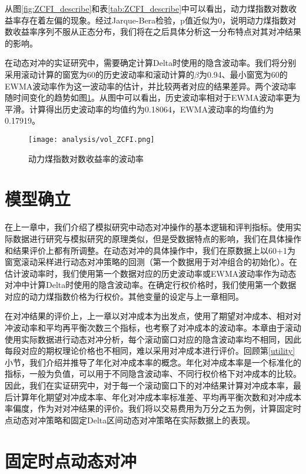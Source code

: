 从图\ref{fig:ZCFI_describe}和表\ref{tab:ZCFI_describe}中可以看出，动力煤指数对数收益率存在着左偏的现象。经过Jarque-Bera检验，p值近似为0，说明动力煤指数对数收益率序列不服从正态分布，我们将在之后具体分析这一分布特点对其对冲结果的影响。

在动态对冲的实证研究中，需要确定计算Delta时使用的隐含波动率。我们将分别采用滚动计算的窗宽为60的历史波动率和滚动计算的$\beta$为0.94、最小窗宽为60的EWMA波动率作为这一波动率的估计，并比较两者对应的结果差异。两个波动率随时间变化的趋势如图\ref{fig:vol_ZCFI}。从图中可以看出，历史波动率相对于EWMA波动率更为平滑。计算得出历史波动率的均值约为0.18064，EWMA波动率的均值约为0.17919。

\begin{figure}[htb]
  \centering
  \texttt{[image: analysis/vol\_ZCFI.png]}
  \caption[这里将出现在插图索引中]
    {动力煤指数对数收益率的波动率}
  \label{fig:vol_ZCFI}
\end{figure}

\section{模型确立}

在上一章中，我们介绍了模拟研究中动态对冲操作的基本逻辑和评判指标。使用实际数据进行研究与模拟研究的原理类似，但是受数据特点的影响，我们在具体操作和结果评价上都有所调整。在动态对冲的具体操作中，我们在原数据上以60+1为窗宽滚动采样进行动态对冲策略的回测（第一个数据用于对冲组合的初始化）。在估计波动率时，我们使用第一个数据对应的历史波动率或EWMA波动率作为动态对冲中计算Delta时使用的隐含波动率。在确定行权价格时，我们使用第一个数据对应的动力煤指数价格为行权价。其他变量的设定与上一章相同。

在对冲结果的评价上，上一章以对冲成本为出发点，使用了期望对冲成本、相对对冲波动率和平均再平衡次数三个指标，也考察了对冲成本的波动率。本章由于滚动使用实际数据进行动态对冲分析，每个滚动窗口对应的隐含波动率均不相同，因此每段对应的期权理论价格也不相同，难以采用对冲成本进行评价。回顾第\ref{utility}小节，我们介绍并推导了年化对冲成本率的概念。年化对冲成本率是一个标准化的指标，一般为负值，可以用于不同隐含波动率、不同行权价格下对冲成本的比较。因此，我们在实证研究中，对于每一个滚动窗口下的对冲结果计算对冲成本率，最后计算年化期望对冲成本率、年化对冲成本率标准差、平均再平衡次数和对冲成本率偏度，作为对对冲结果的评价。我们将以交易费用为万分之五为例，计算固定时点动态对冲策略和固定Delta区间动态对冲策略在实际数据上的表现。

\section{固定时点动态对冲}

